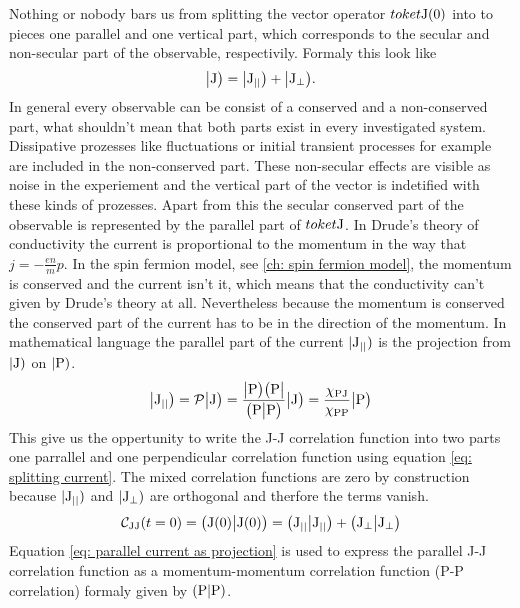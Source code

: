 Nothing or nobody bars us from splitting the vector operator $toket{\mathrm{J}(0)}$ into to pieces one parallel and one vertical part, which corresponds to the secular and non-secular part of the observable, respectivily.
Formaly this look like
%
\begin{align}
	\big|{\mathrm{J}}\big) = \big|{\mathrm{J}_{\mid\mid}}\big) + \big|{\mathrm{J}_{\bot}}\big).
	\label{eq: splitting current}
\end{align}
%
In general every observable can be consist of a conserved and a non-conserved part, what shouldn't mean that both parts exist in every investigated system.
Dissipative prozesses like fluctuations or initial transient processes for example are included in the non-conserved part.
These non-secular effects are visible as noise in the experiement and the vertical part of the vector is indetified with these kinds of prozesses.
Apart from this the secular conserved part of the observable is represented by the parallel part of $toket{\mathrm{J}}$.
In Drude's theory of conductivity the current is proportional to the momentum in the way that $j = -\frac{en}{m}p$.
In the spin fermion model, see \ref{ch: spin fermion model}, the momentum is conserved and the current isn't it, which means that the conductivity can't given by Drude's theory at all.
Nevertheless because the momentum is conserved the conserved part of the current has to be in the direction of the momentum.
In mathematical language the parallel part of the current $|\mathrm{\mathrm{J}_{\mid\mid}})$ is the projection from $|\mathrm{\mathrm{J}})$ on $|\mathrm{\mathrm{P}})$.
%
\begin{align}
	\big|{\mathrm{J}_{\mid\mid}}\big) = \mathcal{P}\big|{\mathrm{J}}\big) = \frac{\big|{\mathrm{P}}\big)\big({\mathrm{P}}\big|}{\big({\mathrm{P}}\big|{\mathrm{P}}\big)} \big|{\mathrm{J}}\big) = \frac{\chi_{\mathrm{PJ}}}{\chi_{\mathrm{PP}}} \big|{\mathrm{P}}\big)
	\label{eq: parallel current as projection}
\end{align}
%
This give us the oppertunity to write the J-J correlation function into two parts one parrallel and one perpendicular correlation function using equation \eqref{eq: splitting current}.
The mixed correlation functions are zero by construction because $|\mathrm{\mathrm{J}_{\mid\mid}})$ and $|\mathrm{\mathrm{J}_{\bot}})$ are orthogonal and therfore the terms vanish.
%
\begin{align}
	\mathcal{C}_{\mathrm{JJ}}(t=0) = \big({\mathrm{J}(0)}\big|{\mathrm{J}(0)}\big) = \big({\mathrm{J}_{\mid\mid}}\big|{\mathrm{J}_{\mid\mid}}\big) + \big({\mathrm{J}_{\bot}}\big|{\mathrm{J}_{\bot}}\big)
\end{align}
%
Equation \eqref{eq: parallel current as projection} is used to express the parallel J-J correlation function as a momentum-momentum correlation function (P-P correlation) formaly given by $({\mathrm{P}}|{\mathrm{P}})$.
